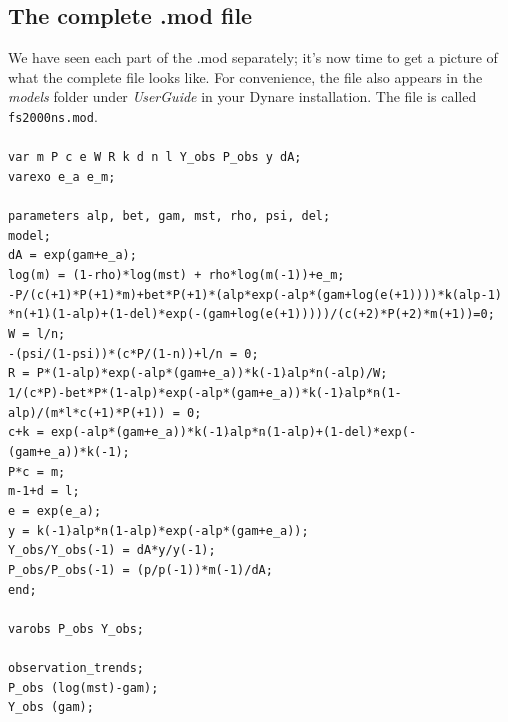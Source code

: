 \subsection{The complete .mod file}
We have seen each part of the .mod separately; it's now time to get a picture of what the complete file looks like. For convenience, the file also appears in the \textsl{models} folder under \textsl{UserGuide} in your Dynare installation. The file is called \texttt{fs2000ns.mod}. \\
\\
\texttt{var m P c e W R k d n l Y\_obs P\_obs y dA; \\
varexo e\_a e\_m;\\
\\
parameters alp, bet, gam, mst, rho, psi, del;
\\
model;\\
dA = exp(gam+e\_a);\\
log(m) = (1-rho)*log(mst) + rho*log(m(-1))+e\_m;\\
-P/(c(+1)*P(+1)*m)+bet*P(+1)*(alp*exp(-alp*(gam+log(e(+1))))*k$\hat{}$(alp-1)\\
*n(+1)$\hat{}$(1-alp)+(1-del)*exp(-(gam+log(e(+1)))))/(c(+2)*P(+2)*m(+1))=0;\\
W = l/n;\\
-(psi/(1-psi))*(c*P/(1-n))+l/n = 0;\\
R = P*(1-alp)*exp(-alp*(gam+e\_a))*k(-1)$\hat{}$alp*n$\hat{}$(-alp)/W;\\
1/(c*P)-bet*P*(1-alp)*exp(-alp*(gam+e\_a))*k(-1)$\hat{}$alp*n$\hat{}$(1-alp)/(m*l*c(+1)*P(+1)) = 0;\\
c+k = exp(-alp*(gam+e\_a))*k(-1)$\hat{}$alp*n$\hat{}$(1-alp)+(1-del)*exp(-(gam+e\_a))*k(-1);\\
P*c = m;\\
m-1+d = l;\\
e = exp(e\_a);\\
y = k(-1)$\hat{}$alp*n$\hat{}$(1-alp)*exp(-alp*(gam+e\_a));\\
Y\_obs/Y\_obs(-1) = dA*y/y(-1);\\
P\_obs/P\_obs(-1) = (p/p(-1))*m(-1)/dA;\\
end;\\
\\
varobs P\_obs Y\_obs;\\
\\
observation\_trends;\\
P\_obs (log(mst)-gam);\\
Y\_obs (gam);\\
}
